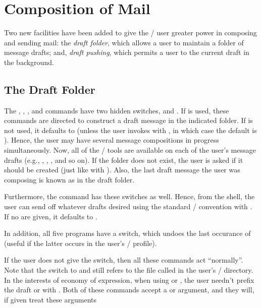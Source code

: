 \section{Composition of Mail}
Two new facilities have been added to give the \MH/ user greater power in
composing and sending mail:
the {\it draft folder},
which allows a user to maintain a folder of message drafts;
and, {\it draft pushing},
which permits a user to  the current draft in the background.
\subsection{The Draft Folder}
The , , , and  commands have two
hidden switches,  and .
If  is used,
these commands are directed to construct a draft message in the indicated
folder.
If  is not used, it defaults to 
(unless the user invokes  with ,
in which case the default is ).
Hence, the user may have several message compositions in progress
simultaneously.
Now, all of the \MH/ tools are available on each of the user's message
drafts
(e.g., , , , and so on).
If the folder does not exist,
the user is asked if it should be created (just like with ).
Also,
the last draft message the user was composing is known as  in the
draft folder.
\par
Furthermore,
the  command has these switches as well.
Hence, from the shell,
the user can send off whatever drafts desired using the
standard \MH/  convention with .
If no  are given, it defaults to .
\par
In addition,
all five programs have a  switch,
which undoes the last occurance of 
(useful if the latter occurs in the user's \MH/ profile).
\par
If the user does not give the  switch,
then all these commands act ``normally''.
Note that the  switch to  and 
still refers to the file called  in the user's \MH/
directory.
In the interests of economy of expression,
when using  or ,
the user needn't prefix the draft  or  with
.
Both of these commands accept a  or  argument,
and they will, if given  treat these arguments
